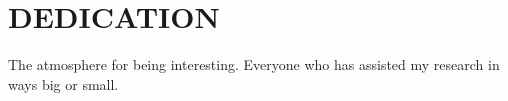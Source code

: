 \chapter*{DEDICATION}

The atmosphere for being interesting. 
Everyone who has assisted my research in ways big or small.
